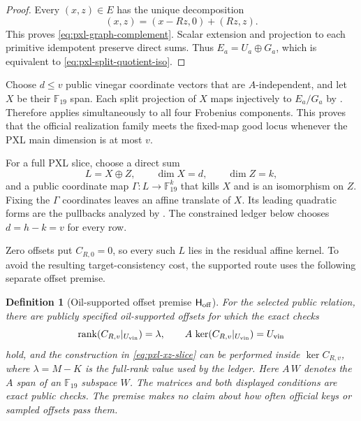\documentclass[11pt]{article}
\newtheorem{definition}[definition]{Definition}
\newcommand{\F}{\mathbb F}
\newcommand{\rank}{\operatorname{rank}}
\begin{document}
\begin{proof}
Every $(x,z)\in E$ has the unique decomposition
\[
 (x,z)=(x-Rz,0)+(Rz,z).
\]
This proves \eqref{eq:pxl-graph-complement}.  Scalar extension and projection
to each primitive idempotent preserve direct sums.  Thus
$E_a=U_a\oplus G_a$, which is equivalent to
\eqref{eq:pxl-split-quotient-iso}.
\end{proof}

Choose $d\le v$ public vinegar coordinate vectors that are $A$-independent,
and let $X$ be their $\F_{19}$ span.  Each split projection of $X$ maps
injectively to $E_a/G_a$ by .  Therefore
 applies simultaneously to all four
Frobenius components.  This proves that the official realization family meets
the fixed-map good locus whenever the PXL main dimension is at most $v$.

For a full PXL slice, choose a direct sum
\begin{equation}
 L=X\oplus Z,
 \qquad \dim X=d,
 \qquad \dim Z=k,                                   \label{eq:pxl-xz-slice}
\end{equation}
and a public coordinate map $\Gamma:L\to\F_{19}^k$ that kills $X$ and is an
isomorphism on $Z$.  Fixing the $\Gamma$ coordinates leaves an affine
translate of $X$.  Its leading quadratic forms are the pullbacks analyzed by
.  The constrained ledger below chooses
$d=h-k=v$ for every row.

Zero offsets put $C_{R,0}=0$, so every such $L$ lies in the residual affine
kernel.  To avoid the resulting target-consistency cost, the supported route
uses the following separate offset premise.

\begin{definition}[Oil-supported offset premise $\mathsf H_{\rm off}$]
\label{def:pxl-offset}
For the selected public relation, there are publicly specified oil-supported
offsets for which the exact checks
\begin{equation}
 \rank(C_{R,v}|_{U_{\rm vin}})=\lambda,
 \qquad
 A\,\ker(C_{R,v}|_{U_{\rm vin}})=U_{\rm vin}         \label{eq:pxl-offset-checks}
\end{equation}
hold, and the construction in \eqref{eq:pxl-xz-slice} can be performed inside
$\ker C_{R,v}$, where $\lambda=M-K$ is the full-rank value used by the
ledger.  Here $A\,W$ denotes the $A$ span of an $\F_{19}$ subspace
$W$.  The matrices and both displayed conditions are exact public checks.
The premise makes no claim about how often official keys or sampled offsets
pass them.
\end{definition}
\end{document}
